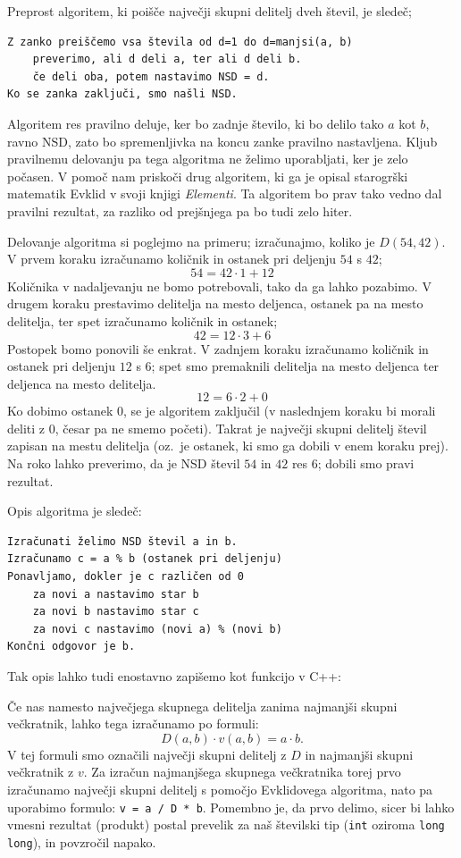 \documentclass{book}
\begin{document}
Preprost algoritem, ki poišče največji skupni delitelj dveh števil, je sledeč;
\begin{verbatim}
Z zanko preiščemo vsa števila od d=1 do d=manjsi(a, b)
    preverimo, ali d deli a, ter ali d deli b.
    če deli oba, potem nastavimo NSD = d.
Ko se zanka zaključi, smo našli NSD.
\end{verbatim}
Algoritem res pravilno deluje, ker bo zadnje število, ki bo delilo tako $a$ kot
$b$, ravno NSD, zato bo spremenljivka na koncu zanke pravilno nastavljena.
Kljub pravilnemu delovanju pa tega algoritma ne želimo uporabljati, ker je zelo
počasen.
V pomoč nam priskoči drug algoritem, ki ga je opisal starogrški matematik Evklid
v svoji knjigi \emph{Elementi}.
Ta algoritem bo prav tako vedno dal pravilni rezultat, za razliko od prejšnjega
pa bo tudi zelo hiter.

\newpage
\begin{examples}
  Delovanje algoritma si poglejmo na primeru; izračunajmo, koliko je $D(54,
  42)$.
  V prvem koraku izračunamo količnik in ostanek pri deljenju $54$ s $42$;
  \[
	54 = 42 \cdot 1 + 12
  \]
  Količnika v nadaljevanju ne bomo potrebovali, tako da ga lahko pozabimo.
  V drugem koraku prestavimo delitelja na mesto deljenca, ostanek pa na mesto
  delitelja, ter spet izračunamo količnik in ostanek;
  \[
	42 = 12 \cdot 3 + 6
  \]
  Postopek bomo ponovili še enkrat.
  V zadnjem koraku izračunamo količnik in ostanek pri deljenju $12$ s $6$; spet
  smo premaknili delitelja na mesto deljenca ter deljenca na mesto delitelja.
  \[
	12 = 6 \cdot 2 + 0
  \]
  Ko dobimo ostanek $0$, se je algoritem zaključil (v naslednjem koraku bi
  morali deliti z $0$, česar pa ne smemo početi).
  Takrat je največji skupni delitelj števil zapisan na mestu delitelja
  (oz.~je ostanek, ki smo ga dobili v enem koraku prej).
  Na roko lahko preverimo, da je NSD števil $54$ in $42$ res $6$; dobili smo
  pravi rezultat.
\end{examples}

Opis algoritma je sledeč:
\begin{verbatim}
Izračunati želimo NSD števil a in b.
Izračunamo c = a % b (ostanek pri deljenju)
Ponavljamo, dokler je c različen od 0
    za novi a nastavimo star b
    za novi b nastavimo star c
    za novi c nastavimo (novi a) % (novi b)
Končni odgovor je b.
\end{verbatim}
Tak opis lahko tudi enostavno zapišemo kot funkcijo v C++:

Če nas namesto največjega skupnega delitelja zanima najmanjši skupni večkratnik,
lahko tega izračunamo po formuli:
\[
  D(a, b) \cdot v(a, b) = a \cdot b.
\]
V tej formuli smo označili največji skupni delitelj z $D$ in najmanjši skupni
večkratnik z $v$.
Za izračun najmanjšega skupnega večkratnika torej prvo izračunamo največji
skupni delitelj s pomočjo Evklidovega algoritma, nato pa uporabimo formulo:
\verb+v = a / D * b+.
Pomembno je, da prvo delimo, sicer bi lahko vmesni rezultat (produkt) postal
prevelik za naš številski tip (\verb+int+ oziroma \verb+long long+), in
povzročil napako.
\end{document}
